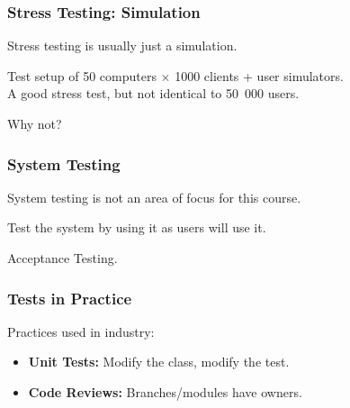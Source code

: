 \begin{frame}
\frametitle{Stress Testing: Simulation}

\begin{changemargin}{1cm}

Stress testing is usually just a simulation.

Test setup of 50 computers $\times$ 1000 clients + user simulators.\\
\quad A good stress test, but not identical to 50~000 users.

Why not? 

\end{changemargin}
\end{frame}


\begin{frame}
\frametitle{System Testing}
\begin{changemargin}{1cm}
System testing is not an area of focus for this course.

Test the system by using it as users will use it.

Acceptance Testing.

\end{changemargin}
\end{frame}



\begin{frame}
\frametitle{Tests in Practice}

\begin{changemargin}{1cm}

Practices used in industry:

\begin{itemize}
\item \textbf{Unit Tests:} Modify the class, modify the test. 

\item \textbf{Code Reviews:} Branches/modules have owners. 


\end{itemize}
\end{changemargin}
\end{frame}

